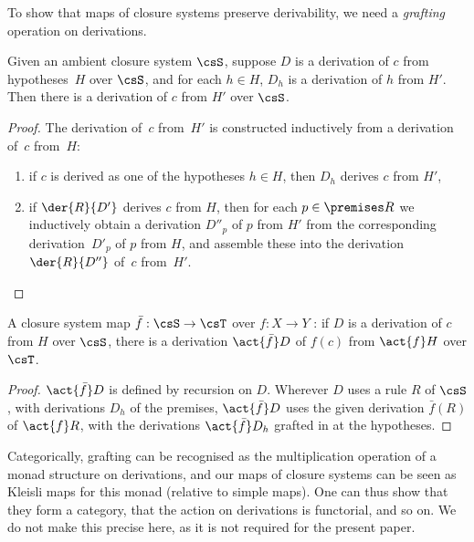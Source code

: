 To show that maps of closure systems preserve derivability, we need a \emph{grafting} operation on derivations.

\begin{lemma}
  \label{lem:hypotheses-grafting}
  Given an ambient closure system $\csS$, suppose $D$ is a derivation of $c$ from hypotheses~$H$ over $\csS$, and for each $h \in H$, $D_h$ is a derivation of $h$ from $H'$.
  Then there is a derivation of $c$ from $H'$ over $\csS$.
\end{lemma}

\begin{proof}
  The derivation of~$c$ from~$H'$ is constructed inductively from a derivation of~$c$ from~$H$:
  \begin{enumerate}
  \item if $c$ is derived as one of the hypotheses $h \in H$, then $D_h$ derives $c$ from $H'$,
  \item if $\der{R}{D'}$ derives $c$ from $H$, then for each $p \in \premises R$ we inductively obtain a derivation $D''_p$ of $p$ from $H'$ from the corresponding derivation~$D'_p$ of $p$ from $H$, and assemble these into the derivation $\der{R}{D''}$ of~$c$ from~$H'$. \qedhere
  \end{enumerate}
\end{proof}

\begin{definition}
  A closure system map $\bar{f} : \csS \to \csT$ over $f : X \to Y$ : if $D$ is a derivation of $c$ from $H$ over $\csS$, there is a derivation $\act{\bar{f}}D$ of $f(c)$ from $\act{f}H$ over $\csT$.
\end{definition}

\begin{proof}
  $\act{\bar{f}}D$ is defined by recursion on $D$.
  Wherever $D$ uses a rule $R$ of $\csS$, with derivations $D_h$ of the premises, $\act{\bar{f}}D$ uses the given derivation $\bar{f}(R)$ of $\act{f}R$, with the derivations $\act{\bar{f}}D_h$ grafted in at the hypotheses.
\end{proof}

Categorically, grafting can be recognised as the multiplication operation of a monad structure on derivations, and our maps of closure systems can be seen as Kleisli maps for this monad (relative to simple maps).
%
One can thus show that they form a category, that the action on derivations is functorial, and so on.
%
We do not make this precise here, as it is not required for the present paper.

